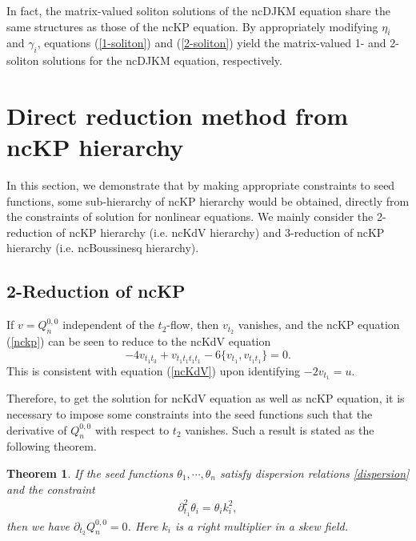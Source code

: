 \documentclass[11p,reqno]{amsart}
\numberwithin{equation}{section}
\newtheorem{theorem}{Theorem}[section]
\numberwithin{equation}{section}
\begin{document}
In fact, the matrix-valued soliton solutions of the ncDJKM equation share the same structures as those of the ncKP equation. By appropriately modifying $\eta_i$ and $\gamma_i$, equations (\ref{1-soliton}) and (\ref{2-soliton}) yield the matrix-valued 1- and 2-soliton solutions for the ncDJKM equation, respectively.


\section{Direct reduction method from ncKP hierarchy}
In this section, we demonstrate that by making appropriate constraints to seed functions, 
some sub-hierarchy of ncKP hierarchy would be obtained, directly from the constraints of solution for nonlinear equations. 
We mainly consider the 2-reduction of ncKP hierarchy (i.e. ncKdV hierarchy) and 3-reduction of ncKP hierarchy (i.e. ncBoussinesq hierarchy). 

\subsection{2-Reduction of ncKP}
If $v = Q_n^{0, 0}$ independent of the $t_2$-flow, then $v_{t_2}$ vanishes, and the ncKP equation (\ref{nckp}) can be seen to reduce to the ncKdV equation
\begin{equation}
    -4v_{t_1t_3} + v_{t_1t_1t_1t_1} - 6\{v_{t_1}, v_{t_1t_1}\} = 0.
\end{equation}
This is consistent with equation (\ref{ncKdV}) upon identifying $-2v_{t_1} = u$.

Therefore, to get the solution for ncKdV equation as well as ncKP equation, it is necessary to impose some constraints into the seed functions such that the derivative of $Q_n^{0, 0}$ with respect to $t_2$ vanishes. Such a result is stated as the following theorem. 
\begin{theorem} \label{thm1}
    If the seed functions $\theta_1,\cdots,\theta_n$ satisfy dispersion relations \eqref{dispersion}
   and the constraint 
   \begin{align}\label{dis_kdv}
   \partial_{t_1}^2 \theta_i=\theta_i k_i^2,
   \end{align} then
    we have $\partial_{t_2}Q_n^{0,0}=0$.
Here $k_i$ is a right multiplier in a skew field. 
\end{theorem}
\end{document}
